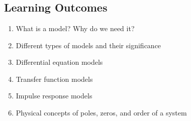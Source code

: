 \documentclass[../notes-main.tex]{subfiles}
\begin{document}
\chapter{}
\section*{Learning Outcomes}
\begin{enumerate}[label=\blacktriangleright, leftmargin=*, itemsep=0.5em]
    \item What is a model? Why do we need it?
    \item Different types of models and their significance
    \item Differential equation models
    \item Transfer function models
    \item Impulse response models
    \item Physical concepts of poles, zeros, and order of a system
\end{enumerate}
\newpage

\newpage

\end{document}
